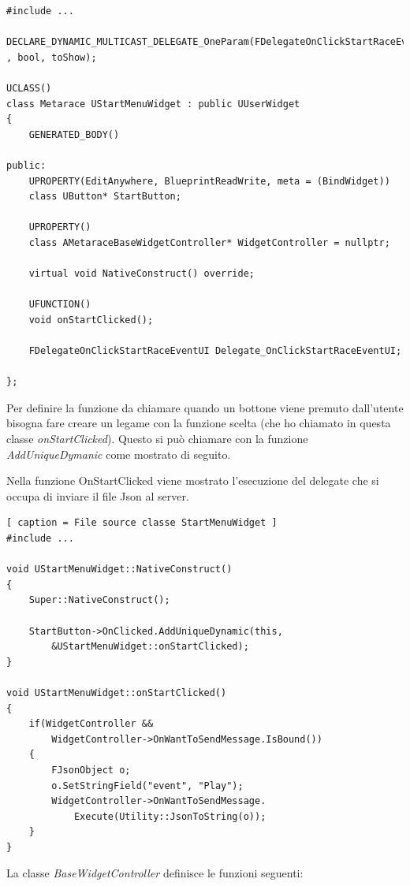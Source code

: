     \begin{lstlisting}[caption = File header della classe StartMenuWidget]
#include ...

DECLARE_DYNAMIC_MULTICAST_DELEGATE_OneParam(FDelegateOnClickStartRaceEventUI , bool, toShow);

UCLASS()
class Metarace UStartMenuWidget : public UUserWidget
{
	GENERATED_BODY()
	
public:
	UPROPERTY(EditAnywhere, BlueprintReadWrite, meta = (BindWidget))
	class UButton* StartButton;

	UPROPERTY()
	class AMetaraceBaseWidgetController* WidgetController = nullptr;

	virtual void NativeConstruct() override;

	UFUNCTION()
	void onStartClicked();

	FDelegateOnClickStartRaceEventUI Delegate_OnClickStartRaceEventUI;
	
};
    \end{lstlisting}

    Per definire la funzione da chiamare quando un bottone viene premuto dall'utente bisogna fare creare un legame con la funzione scelta (che ho chiamato in questa classe \textit{onStartClicked}).
    Questo si può chiamare con la funzione \textit{AddUniqueDymanic} come mostrato di seguito.

    Nella funzione OnStartClicked viene mostrato l'esecuzione del delegate che si occupa di inviare il file Json al server. 

    \begin{lstlisting}[ caption = File source classe StartMenuWidget ]
#include ...

void UStartMenuWidget::NativeConstruct()
{
    Super::NativeConstruct();

    StartButton->OnClicked.AddUniqueDynamic(this, 
        &UStartMenuWidget::onStartClicked);
}

void UStartMenuWidget::onStartClicked()
{
    if(WidgetController && 
        WidgetController->OnWantToSendMessage.IsBound())
    {
        FJsonObject o;
        o.SetStringField("event", "Play");
        WidgetController->OnWantToSendMessage.
            Execute(Utility::JsonToString(o));	
    }
}
    \end{lstlisting}

    La classe \textit{BaseWidgetController} definisce le funzioni seguenti:

